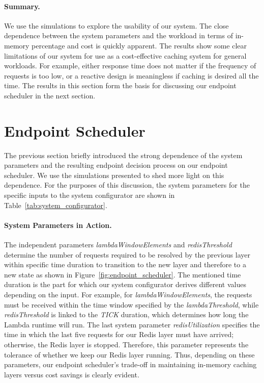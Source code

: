 \paragraph{Summary.}
We use the simulations to explore the usability of our system. The close dependence between the system parameters and the workload in terms of in-memory percentage and cost is quickly apparent. The results show some clear limitations of our system for use as a cost-effective caching system for general workloads. For example, either response time does not matter if the frequency of requests is too low, or a reactive design is meaningless if caching is desired all the time. The results in this section form the basis for discussing our endpoint scheduler in the next section.

\section{Endpoint Scheduler}
\label{sec:endpoint_scheduler}
The previous section briefly introduced the strong dependence of the system parameters and the resulting endpoint decision process on our endpoint scheduler. We use the simulations presented to shed more light on this dependence. For the purposes of this discussion, the system parameters for the specific inputs to the system configurator are shown in Table~\ref{tab:system_configurator}.

\paragraph{System Parameters in Action.}
The independent parameters \emph{lambdaWindowElements} and \emph{redisThreshold} determine the number of requests required to be resolved by the previous layer within specific time duration to transition to the new layer and therefore to a new state as shown in Figure~\ref{fig:endpoint_scheduler}. The mentioned time duration is the part for which our system configurator derives different values depending on the input. For example, for \emph{lambdaWindowElements}, the requests must be received within the time window specified by the \emph{lambdaThreshold}, while \emph{redisThreshold} is linked to the \emph{TICK} duration, which determines how long the Lambda runtime will run. The last system parameter \emph{redisUtilization} specifies the time in which the last five requests for our Redis layer must have arrived; otherwise, the Redis layer is stopped. Therefore, this parameter represents the tolerance of whether we keep our Redis layer running. Thus, depending on these parameters, our endpoint scheduler's trade-off in maintaining in-memory caching layers versus cost savings is clearly evident.

